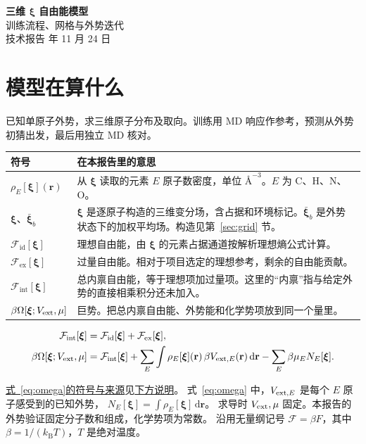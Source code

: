 \documentclass[UTF8,fontset=fandol,11pt]{ctexart}
\newcommand{\xiF}{\bm\xi}
\newcommand{\X}{\bar{\bm\xi}}
\newcommand{\Ex}{\mathcal F_{\mathrm{ex}}}
\newcommand{\Id}{\mathcal F_{\mathrm{id}}}
\newcommand{\Int}{\mathcal F_{\mathrm{int}}}
\newcommand{\fref}[2]{\par{\footnotesize \hyperref[#1]{式~\ref{#1}的符号与来源}见\hyperref[#2]{下方说明}。}}
\newcommand{\defat}[1]{\phantomsection\label{#1}}
\begin{document}
\begin{center}
{\LARGE\bfseries\color{ink} 三维 \(\xiF\) 自由能模型}\\[4pt]
{\Large 训练流程、网格与外势迭代}\\[4pt]
{\small 技术报告 年 11 月 24 日}
\end{center}

\section{模型在算什么}\label{sec:definition}

已知单原子外势，求三维原子分布及取向。训练用 MD 响应作参考，预测从外势初猜出发，最后用独立 MD 核对。

\begin{center}\small
\begin{tabularx}{\linewidth}{@{}lX@{}}
\toprule
符号 & 在本报告里的意思 \\
\midrule
$\rho_E[\xiF](\mathbf r)$ & 从 $\xiF$ 读取的元素 $E$ 原子数密度，单位 $\text{\AA}^{-3}$。$E$ 为 C、H、N、O。\\
$\xiF$、$\X_b$ & $\xiF$ 是逐原子构造的三维变分场，含占据和环境标记。$\X_b$ 是外势状态下的加权平均场。构造见第~\ref{sec:grid} 节。\\
$\Id[\xiF]$ & 理想自由能，由 $\xiF$ 的元素占据通道按解析理想熵公式计算。\\
$\Ex[\xiF]$ & 过量自由能。相对于项目选定的理想参考，剩余的自由能贡献。\\
$\Int[\xiF]$ & 总内禀自由能，等于理想项加过量项。这里的“内禀”指与给定外势的直接相乘积分还未加入。\\
$\beta\Omega[\xiF;V_{\rm ext},\mu]$ & 巨势。把总内禀自由能、外势能和化学势项放到同一个量里。\\
\bottomrule
\end{tabularx}
\end{center}

\begin{equation}
\begin{aligned}
\Int[\xiF]&=\Id[\xiF]+\Ex[\xiF],\\
\beta\Omega[\xiF;V_{\rm ext},\mu]&=\Int[\xiF]+\sum_E\int \rho_E[\xiF](\mathbf r)\,\beta V_{{\rm ext},E}(\mathbf r)\,\mathrm d\mathbf r
-\sum_E\beta\mu_E N_E[\xiF].
\end{aligned}
\label{eq:omega}
\end{equation}
\fref{eq:omega}{def:omega}
\defat{def:omega}
式~\ref{eq:omega} 中，$V_{{\rm ext},E}$ 是每个 $E$ 原子感受到的已知外势，
$N_E[\xiF]=\int\rho_E[\xiF]\,\mathrm d\mathbf r$。
求导时 $V_{\rm ext},\mu$ 固定。本报告的外势验证固定分子数和组成，化学势项为常数。
沿用无量纲记号 $\mathcal F=\beta F$，其中 $\beta=1/(k_{\mathrm B}T)$，$T$ 是绝对温度。
\end{document}
